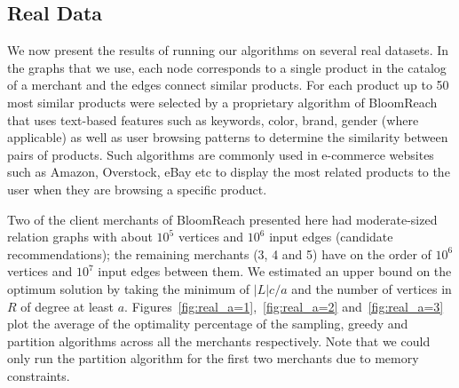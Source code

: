 \subsection{Real Data}

We now present the results of running our algorithms on several real
datasets. In the graphs that we use, each node corresponds to a single
product in the catalog of a merchant and the edges connect similar
products. For each product up to 50 most similar products were
selected by a proprietary algorithm of BloomReach that uses text-based
features such as keywords, color, brand, gender (where applicable) as
well as user browsing patterns to determine the similarity between
pairs of products. Such algorithms are commonly used in e-commerce websites
such as Amazon, Overstock, eBay etc to display the most related products 
to the user when they are browsing a specific product. \vs

Two of the client merchants of BloomReach presented here had
moderate-sized relation graphs with about $10^5$ vertices and $10^6$
input edges (candidate recommendations); the remaining merchants (3, 4
and 5) have on the order of $10^6$ vertices and $10^7$ input edges
between them.  We estimated an upper bound on the optimum solution by
taking the minimum of $|L|c/a$ and the number of vertices in $R$ of
degree at least $a$. Figures~\ref{fig:real_a=1},~\ref{fig:real_a=2}
and~\ref{fig:real_a=3} plot the average of the optimality percentage
of the sampling, greedy and partition algorithms across all the
merchants respectively. Note that we could only run the partition
algorithm for the first two merchants due to memory constraints. \vs

